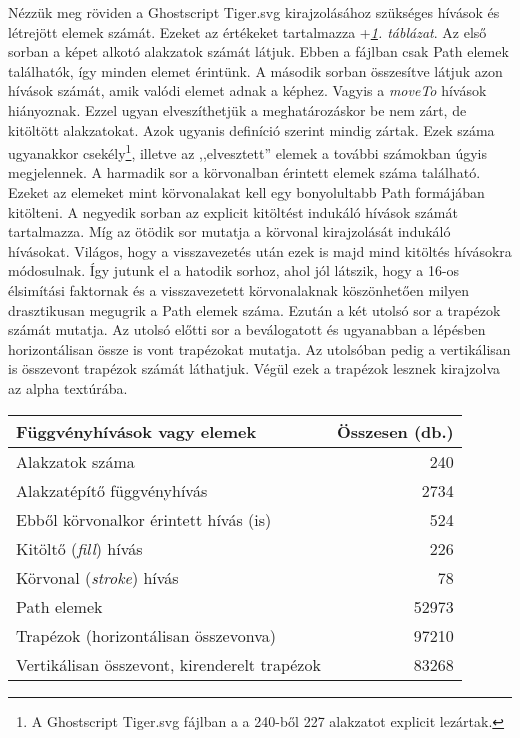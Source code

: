\documentclass[12pt]{report}
\theoremstyle{definition}
\newcommand{\func}[1]{{\textsl{#1}}}
\begin{document}
Nézzük meg röviden a Ghostscript Tiger.svg kirajzolásához szükséges hívások és
létrejött elemek számát. Ezeket az értékeket tartalmazza
\az+\emph{\ref{tab:numbers}. táblázat}. Az első sorban a képet alkotó alakzatok
számát látjuk. Ebben a fájlban csak Path elemek találhatók, így minden elemet
érintünk. A második sorban összesítve látjuk azon hívások számát, amik valódi
elemet adnak a képhez. Vagyis a \func{moveTo} hívások hiányoznak. Ezzel ugyan
elveszíthetjük a meghatározáskor be nem zárt, de kitöltött alakzatokat. Azok
ugyanis definíció szerint mindig zártak. Ezek száma ugyanakkor
csekély\footnote{A Ghostscript Tiger.svg fájlban a a 240-ből 227 alakzatot
explicit lezártak.}, illetve az ,,elvesztett'' elemek a további számokban úgyis
megjelennek. A harmadik sor a körvonalban érintett elemek száma található.
Ezeket az elemeket mint körvonalakat kell egy bonyolultabb Path formájában
kitölteni. A negyedik sorban az explicit kitöltést indukáló hívások számát
tartalmazza. Míg az ötödik sor mutatja a körvonal kirajzolását indukáló
hívásokat. Világos, hogy a visszavezetés után ezek is majd mind kitöltés
hívásokra módosulnak. Így jutunk el a hatodik sorhoz, ahol jól látszik, hogy a
16-os élsimítási faktornak és a visszavezetett körvonalaknak köszönhetően
milyen drasztikusan megugrik a Path elemek száma. Ezután a két utolsó sor a
trapézok számát mutatja. Az utolsó előtti sor a beválogatott és ugyanabban a
lépésben horizontálisan össze is vont trapézokat mutatja. Az utolsóban pedig a
vertikálisan is összevont trapézok számát láthatjuk. Végül ezek a trapézok
lesznek kirajzolva az alpha textúrába.

  \begin{table}[!t]
     \label{tab:numbers}
    \renewcommand*{\arraystretch}{1.2}
    \small
    \centering
    \begin{tabular}{|l|r|}
      \hline
      Függvényhívások vagy elemek & Összesen (db.) \\
      \hline \hline
      Alakzatok száma & 240\\
      Alakzatépítő függvényhívás & 2734\\
      Ebből körvonalkor érintett hívás (is) & 524\\
      \hline
      Kitöltő (\func{fill}) hívás & 226 \\
      Körvonal (\func{stroke}) hívás & 78 \\
      \hline
      Path elemek & 52973 \\
      Trapézok (horizontálisan összevonva) & 97210 \\
      Vertikálisan összevont, kirenderelt trapézok & 83268 \\
      \hline
    \end{tabular}
  \end{table}
\end{document}
